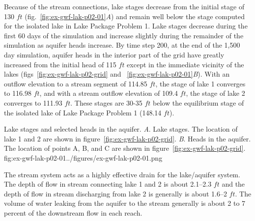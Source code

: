Because of the stream connections, lake stages decrease from the initial stage of 130 $ft$ (fig.~\ref{fig:ex-gwf-lak-p02-01}\textit{A}) and remain well below the stage computed for the isolated lake in Lake Package Problem 1. Lake stages decrease during the first 60 days of the simulation and increase slightly during the remainder of the simulation as aquifer heads increase.  By time step 200, at the end of the 1,500 day simulation, aquifer heads in the interior part of the grid have greatly increased from the initial head of 115 $ft$ except in the immediate vicinity of the lakes (figs~\ref{fig:ex-gwf-lak-p02-grid} and ~\ref{fig:ex-gwf-lak-p02-01}\textit{B}). With an outflow elevation to a stream segment of 114.85 $ft$, the stage of lake 1 converges to 116.98 $ft$, and with a stream outflow elevation of 109.4 $ft$, the stage of lake 2 converges to 111.93 $ft$. These stages are 30-35 $ft$ below the equilibrium stage of the isolated lake of Lake Package Problem 1 (148.14 $ft$).

\begin{StandardFigure}{
                                     Lake stages and selected heads in the aquifer. 
                                     \textit{A}. Lake stages. The location of lake 1 and 2
                                     are shown in figure~\ref{fig:ex-gwf-lak-p02-grid}.
                                     \textit{B}. Heads in the aquifer. The location of points 
                                     A, B, and C are shown in figure~\ref{fig:ex-gwf-lak-p02-grid}.
                                     }{fig:ex-gwf-lak-p02-01}{../figures/ex-gwf-lak-p02-01.png}
\end{StandardFigure}

The stream system acts as a highly effective drain for the lake/aquifer system. The depth of flow in stream connecting lake 1 and 2 is about 2.1--2.3 $ft$ and the depth of flow in stream discharging from lake 2 is generally is about 1.6--2 $ft$. The volume of water leaking from the aquifer to the stream generally is about 2 to 7 percent of the downstream flow in each reach.                                

